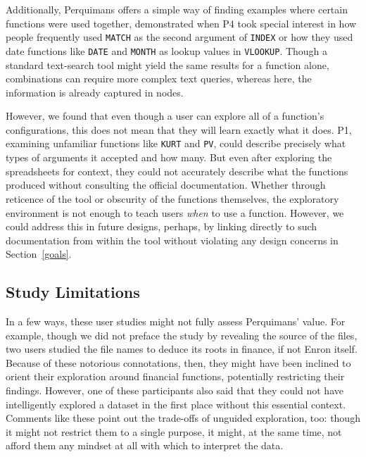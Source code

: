 \documentclass[conference]{IEEEtran}
\newcommand{\toolname}{Perquimans\xspace} \newcommand{\toolnameend}{Perquimans}
\newcommand{\toolnameposs}{Perquimans' }
\begin{document}
	Additionally, \toolname offers a simple way of finding examples where certain
	functions were used together, demonstrated when P4 took special interest in how
	people frequently used \texttt{MATCH} as the second argument of \texttt{INDEX} or how they used
	date functions like \texttt{DATE} and \texttt{MONTH} as lookup values in \texttt{VLOOKUP}. Though a
	standard text-search tool might yield the same results for a function alone,
	combinations can require more complex text queries, whereas here, the
	information is already captured in nodes. 
	
	However, we found that even though a user can explore all of a function's
	configurations, this does not mean that they will learn exactly what it does.
	P1, examining unfamiliar functions like \texttt{KURT} and \texttt{PV}, could describe precisely
	what types of arguments it accepted and how many. But even after exploring the
	spreadsheets for context, they could not accurately describe what the functions
	produced without consulting the official documentation. Whether through
	reticence of the tool or obscurity of the functions themselves, the exploratory
	environment is not enough to teach users \textit{when} to use a function.
	However, we could address this in future designs, perhaps, by linking directly
	to such documentation from within the tool without violating any design
	concerns in Section~\ref{goals}. 
	
	\subsection{Study Limitations} \label{subsec:studylimitations} 
	
	In a few ways, these user studies might not fully assess \toolnameposs value.
	For example, though we did not preface the study by revealing the source of the
	files, two users studied the file names to deduce its roots in finance, if not
	Enron itself. Because of these notorious connotations, then, they might have
	been inclined to orient their exploration around financial functions,
	potentially restricting their findings. However, one of these participants also
	said that they could not have intelligently explored a dataset in the first
	place without this essential context. Comments like these point out the
	trade-offs of unguided exploration, too: though it might not restrict them to a
	single purpose, it might, at the same time, not afford them any mindset at all
	with which to interpret the data. 
	
\end{document}
